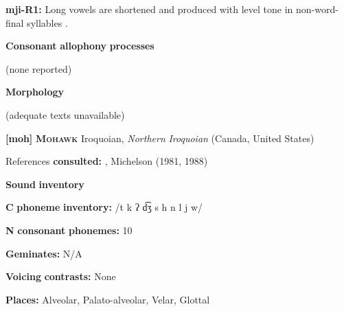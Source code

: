 \documentclass[output=paper]{langsci/langscibook}
\begin{document}
\begin{styleBody}
\textbf{mji-R1:} Long vowels are shortened and produced with level tone in non-word-final syllables \citep[117]{Clark2008}.
\end{styleBody}

\begin{styleBody}
\textbf{Consonant} \textbf{allophony} \textbf{processes}
\end{styleBody}

\begin{styleBody}
(none reported)
\end{styleBody}

\begin{styleBody}
\textbf{Morphology}
\end{styleBody}

\begin{styleBody}
(adequate texts unavailable)
\end{styleBody}

\begin{styleBody}
\textbf{[moh]}   \textbf{\textsc{Mohawk}}  Iroquoian, \textit{Northern} \textit{Iroquoian} (Canada, United States)
\end{styleBody}

\begin{styleBody}
References \textbf{consulted:} \citet{Bonvillain1973}, Michelson (1981, 1988)
\end{styleBody}

\begin{styleBody}
\textbf{Sound} \textbf{inventory}
\end{styleBody}

\begin{styleBody}
\textbf{C} \textbf{phoneme} \textbf{inventory:} /t k ʔ d͡ʒ s h n l j w/
\end{styleBody}

\begin{styleBody}
\textbf{N} \textbf{consonant} \textbf{phonemes:} 10
\end{styleBody}

\begin{styleBody}
\textbf{Geminates:} N/A
\end{styleBody}

\begin{styleBody}
\textbf{Voicing} \textbf{contrasts:} None
\end{styleBody}

\begin{styleBody}
\textbf{Places:} Alveolar, Palato-alveolar, Velar, Glottal
\end{styleBody}
\end{document}

